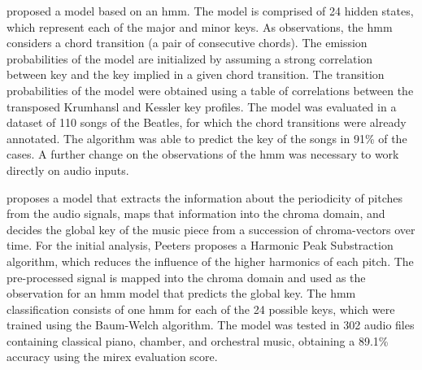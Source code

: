 

\textcite{noland2006key} proposed a model based on an
\gls{hmm}. The model is comprised of 24 hidden states, which
represent each of the major and minor keys. As observations,
the \gls{hmm} considers a chord transition (a pair of
consecutive chords). The emission probabilities of the model
are initialized by assuming a strong correlation between key
and the key implied in a given chord transition. The
transition probabilities of the model were obtained using a
table of correlations between the transposed Krumhansl and
Kessler key profiles. The model was evaluated in a dataset
of 110 songs of the Beatles, for which the chord transitions
were already annotated. The algorithm was able to predict
the key of the songs in 91\% of the cases. A further change
on the observations of the \gls{hmm} was necessary to work
directly on audio inputs.


\textcite{peeters2006chromabased} proposes a model that
extracts the information about the periodicity of pitches
from the audio signals, maps that information into the
chroma domain, and decides the global key of the music piece
from a succession of chroma-vectors over time. For the
initial analysis, Peeters proposes a Harmonic Peak
Substraction algorithm, which reduces the influence of the
higher harmonics of each pitch. The pre-processed signal is
mapped into the chroma domain and used as the observation
for an \gls{hmm} model that predicts the global key. The
\gls{hmm} classification consists of one \gls{hmm} for each
of the 24 possible keys, which were trained using the
Baum-Welch algorithm. The model was tested in 302 audio
files containing classical piano, chamber, and orchestral
music, obtaining a 89.1\% accuracy using the \gls{mirex}
evaluation score.




